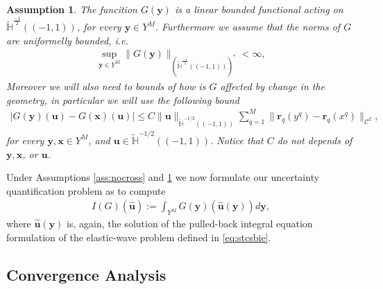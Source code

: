 \documentclass{article}
\newtheorem{assumption}[theorem]{Assumption}
\begin{document}
\begin{assumption}
\label{ass:g}
The funcition $G(\mathbf{y})$ is a linear bounded functional acting on $\widetilde{\mathbb{H}}^{\frac{-1}{2}}((-1,1))$, for every $\mathbf{y} \in Y^M$. Furthermore we assume that the norms of $G$ are uniformelly bounded, i.e.
\begin{align*}
\sup_{\mathbf{y} \in Y^M} \| G(\mathbf{y})\|_{\left(\widetilde{\mathbb{H}}^{\frac{-1}{2}}((-1,1))\right)^*} < \infty,
\end{align*} 
Moreover we will also need to bounds of how is $G$ affected by change in the geometry, in particular we will use the following bound 
\begin{align*}
| G(\mathbf{y})(\mathbf{u}) -G(\mathbf{x})(\mathbf{u})  | \leq C \|\mathbf{u}\|_{\widetilde{\mathbb{H}}^{-1/2}((-1,1))} \sum_{q=1}^M\| \mathbf{r}_q(y^q) - \mathbf{r}_q(x^q)\|_{\mathbf{\mathcal{C}}^2}, 
\end{align*}
for every $\mathbf{y},\mathbf{x} \in Y^M $, and $ \mathbf{u} \in \widetilde{\mathbb{H}}^{-1/2}((-1,1))$. Notice that  $C$ do not depends of $\mathbf{y},\mathbf{x}$, or $\mathbf{u}$.
\end{assumption}

Under Assumptions \ref{ass:nocross} and \ref{ass:g} we now formulate our uncertainty quantification problem as to compute 
\begin{align*}
I(G)(\widehat{\mathbf{u}}):=\int_{Y^M} G(\mathbf{y})(\widehat{\mathbf{u}}(\mathbf{y}))d\mathbf{y},
\end{align*}
where $\widehat{\mathbf{u}}(\mathbf{y})$ is, again, the solution of the pulled-back integral equation formulation of the elastic-wave problem defined in \eqref{eq:stcsbie}.  

\subsection{Convergence Analysis}
\end{document}
